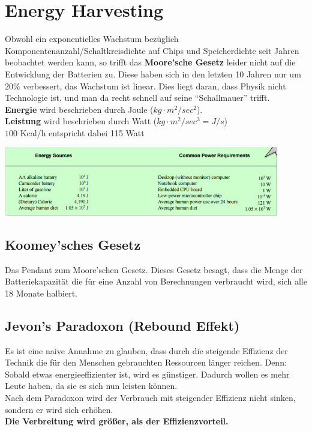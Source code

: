 \documentclass[a4paper]{article}
\begin{document}
\newpage
\section{Energy Harvesting}
Obwohl ein exponentielles Wachstum bezüglich Komponentenanzahl/Schaltkreisdichte auf Chips und Speicherdichte seit Jahren beobachtet werden kann, so trifft das\textbf{ Moore'sche Gesetz} leider nicht auf die Entwicklung der Batterien zu. Diese haben sich in den letzten 10 Jahren nur um $20\%$ verbessert, das Wachstum ist linear. Dies liegt daran, dass Physik nicht Technologie ist, und man da recht schnell auf seine ``Schallmauer'' trifft.\\

\textbf{Energie} wird beschrieben durch Joule ($kg\cdot m^2 / sec^2$).\\
\textbf{Leistung} wird beschrieben durch Watt ($kg\cdot m^2 / sec^3 = J / s$) \\
$100$ Kcal/h entspricht dabei 115 Watt
\begin{center}
	\includegraphics[height = 3cm]{Energy.png}
\end{center}

\subsection{Koomey'sches Gesetz}
Das Pendant zum Moore'schen Gesetz. Dieses Gesetz besagt, dass die Menge der Batteriekapazität die für eine Anzahl von Berechnungen verbraucht wird, sich alle 18 Monate halbiert.

\subsection{Jevon's Paradoxon (Rebound Effekt)}
Es ist eine naive Annahme zu glauben, dass durch die steigende Effizienz der Technik die für den Menschen gebrauchten Ressourcen länger reichen. Denn: Sobald etwas energieeffizienter ist, wird es günstiger. Dadurch wollen es mehr Leute haben, da sie es sich nun leisten können.\\

Nach dem Paradoxon wird der Verbrauch mit steigender Effizienz nicht sinken, sondern er wird sich erhöhen. \\
\textbf{Die Verbreitung wird größer, als der Effizienzvorteil.}
\end{document}
